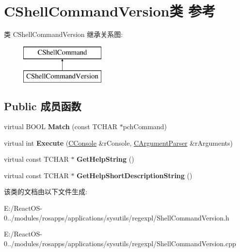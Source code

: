 \hypertarget{class_c_shell_command_version}{}\section{C\+Shell\+Command\+Version类 参考}
\label{class_c_shell_command_version}
类 C\+Shell\+Command\+Version 继承关系图\+:\begin{figure}[H]
\begin{center}
\leavevmode
\includegraphics[height=2.000000cm]{class_c_shell_command_version}
\end{center}
\end{figure}
\subsection*{Public 成员函数}
\begin{DoxyCompactItemize}
\item 
\mbox{\label{class_c_shell_command_version_af0149674c80c0737b2092a52241e2c3a}} 
virtual B\+O\+OL {\bfseries Match} (const T\+C\+H\+AR $\ast$pch\+Command)
\item 
\mbox{\label{class_c_shell_command_version_a20f4a2a7604f2380d2f4482d2f975643}} 
virtual int {\bfseries Execute} (\hyperlink{class_c_console}{C\+Console} \&r\+Console, \hyperlink{class_c_argument_parser}{C\+Argument\+Parser} \&r\+Arguments)
\item 
\mbox{\label{class_c_shell_command_version_a29a82ea3ced1c4b854a91d4453a2291c}} 
virtual const T\+C\+H\+AR $\ast$ {\bfseries Get\+Help\+String} ()
\item 
\mbox{\label{class_c_shell_command_version_a6517a5cdaa111e2f426369d95f712d24}} 
virtual const T\+C\+H\+AR $\ast$ {\bfseries Get\+Help\+Short\+Description\+String} ()
\end{DoxyCompactItemize}


该类的文档由以下文件生成\+:\begin{DoxyCompactItemize}
\item 
E\+:/\+React\+O\+S-\/0../modules/rosapps/applications/sysutils/regexpl/Shell\+Command\+Version.\+h\item 
E\+:/\+React\+O\+S-\/0../modules/rosapps/applications/sysutils/regexpl/Shell\+Command\+Version.\+cpp\end{DoxyCompactItemize}

